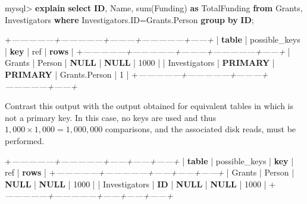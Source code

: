 \documentclass[]{krantz}
\newenvironment{Shaded}{\begin{snugshade}}{\end{snugshade}}
\newcommand{\KeywordTok}[1]{\textcolor[rgb]{0.13,0.29,0.53}{\textbf{#1}}}
\newcommand{\DecValTok}[1]{\textcolor[rgb]{0.00,0.00,0.81}{#1}}
\newcommand{\CommentTok}[1]{\textcolor[rgb]{0.56,0.35,0.01}{\textit{#1}}}
\newcommand{\FunctionTok}[1]{\textcolor[rgb]{0.00,0.00,0.00}{#1}}
\newcommand{\NormalTok}[1]{#1}
\begin{document}
\begin{Shaded}
\begin{Highlighting}[]
\NormalTok{mysql> }\KeywordTok{explain} \KeywordTok{select} \KeywordTok{ID}\NormalTok{, Name, }\FunctionTok{sum}\NormalTok{(Funding) }\KeywordTok{as}\NormalTok{ TotalFunding}
       \KeywordTok{from}\NormalTok{ Grants, Investigators}
       \KeywordTok{where}\NormalTok{ Investigators.ID=Grants.Person }\KeywordTok{group} \KeywordTok{by} \KeywordTok{ID}\NormalTok{;}

\NormalTok{+}\CommentTok{---------------+---------------+---------+---------------+------+}
\NormalTok{| }\KeywordTok{table}\NormalTok{         | possible_keys | }\KeywordTok{key}\NormalTok{     | }\FunctionTok{ref}\NormalTok{           | }\KeywordTok{rows}\NormalTok{ |}
\NormalTok{+}\CommentTok{---------------+---------------+---------+---------------+------+}
\NormalTok{| Grants        | Person        | }\KeywordTok{NULL}\NormalTok{    | }\KeywordTok{NULL}\NormalTok{          | }\DecValTok{1000}\NormalTok{ |}
\NormalTok{| Investigators | }\KeywordTok{PRIMARY}\NormalTok{       | }\KeywordTok{PRIMARY}\NormalTok{ | Grants.Person |    }\DecValTok{1}\NormalTok{ |}
\NormalTok{+}\CommentTok{---------------+---------------+---------+---------------+------+}
\end{Highlighting}
\end{Shaded}

Contrast this output with the output obtained for equivalent tables in
which is not a primary key. In this case, no keys are used and thus
\(1{,}000\times 1{,}000=1{,}000{,}000\) comparisons, and the associated
disk reads, must be performed.

\begin{Shaded}
\begin{Highlighting}[]
\NormalTok{+}\CommentTok{---------------+---------------+------+------+------+}
\NormalTok{| }\KeywordTok{table}\NormalTok{         | possible_keys | }\KeywordTok{key}\NormalTok{  | }\FunctionTok{ref}\NormalTok{  | }\KeywordTok{rows}\NormalTok{ |}
\NormalTok{+}\CommentTok{---------------+---------------+------+------+------+}
\NormalTok{| Grants        | Person        | }\KeywordTok{NULL}\NormalTok{ | }\KeywordTok{NULL}\NormalTok{ | }\DecValTok{1000}\NormalTok{ |}
\NormalTok{| Investigators | }\KeywordTok{ID}\NormalTok{            | }\KeywordTok{NULL}\NormalTok{ | }\KeywordTok{NULL}\NormalTok{ | }\DecValTok{1000}\NormalTok{ |}
\NormalTok{+}\CommentTok{---------------+---------------+------+------+------+}
\end{Highlighting}
\end{Shaded}
\end{document}

